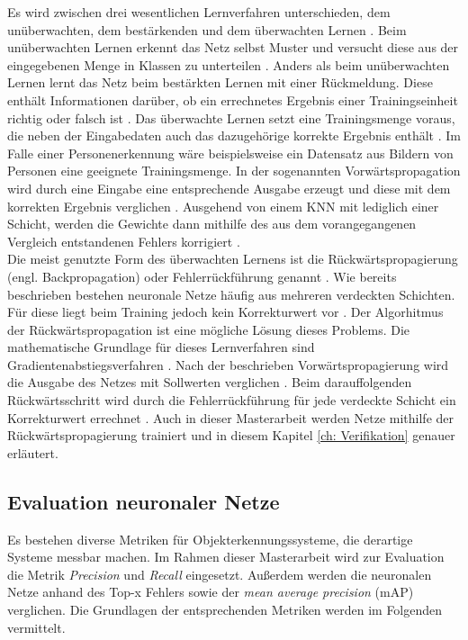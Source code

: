		Es wird zwischen drei wesentlichen Lernverfahren unterschieden, dem unüberwachten, dem bestärkenden und dem überwachten Lernen \cite{Kriesel}. Beim unüberwachten Lernen erkennt das Netz selbst Muster und versucht diese aus der eingegebenen Menge in Klassen zu unterteilen \cite{Kriesel}. Anders als beim unüberwachten Lernen lernt das Netz beim bestärkten Lernen mit einer Rückmeldung. Diese enthält Informationen darüber, ob ein errechnetes Ergebnis einer Trainingseinheit richtig oder falsch ist \cite{Kriesel}. Das überwachte Lernen setzt eine Trainingsmenge voraus, die neben der Eingabedaten auch das dazugehörige korrekte Ergebnis enthält \cite{Kriesel}\cite{bildv2020}. Im Falle einer Personenerkennung wäre beispielsweise ein Datensatz aus Bildern von Personen eine geeignete Trainingsmenge. In der sogenannten Vorwärtspropagation wird durch eine Eingabe eine entsprechende Ausgabe erzeugt und diese mit dem korrekten Ergebnis verglichen \cite{bildv2020}. Ausgehend von einem KNN mit lediglich einer Schicht, werden die Gewichte dann mithilfe des aus dem vorangegangenen Vergleich entstandenen Fehlers korrigiert \cite{bildv2020}.\\
		
		Die meist genutzte Form des überwachten Lernens ist die Rückwärtspropagierung (engl. Backpropagation) oder Fehlerrückführung genannt \cite{Ertel}. Wie bereits beschrieben bestehen neuronale Netze häufig aus mehreren verdeckten Schichten. Für diese liegt beim Training jedoch kein Korrekturwert vor \cite{bildv2020}. Der Algorhitmus der Rückwärtspropagation ist eine mögliche Lösung dieses Problems. Die mathematische Grundlage für dieses Lernverfahren sind Gradientenabstiegsverfahren \cite{Kriesel} \cite{bildv2020}. Nach der beschrieben Vorwärtspropagierung wird die Ausgabe des Netzes mit Sollwerten verglichen \cite{bildv2020}. Beim darauffolgenden Rückwärtsschritt wird durch die Fehlerrückführung für jede verdeckte Schicht ein Korrekturwert errechnet \cite{bildv2020}. Auch in dieser Masterarbeit werden Netze mithilfe der Rückwärtspropagierung trainiert und in diesem Kapitel \ref{ch: Verifikation} genauer erläutert.\\
		
	
		
		\subsection{Evaluation neuronaler Netze}
		\label{subsec: evaluation neuronaler netze}
		Es bestehen diverse Metriken für Objekterkennungssysteme, die derartige Systeme messbar machen. Im Rahmen dieser Masterarbeit wird zur Evaluation die Metrik \textit{Precision} und \textit{Recall} eingesetzt. Außerdem werden die neuronalen Netze anhand des Top-x Fehlers sowie der \textit{mean average precision} (mAP) verglichen. Die Grundlagen der entsprechenden Metriken werden im Folgenden vermittelt.\\
		
